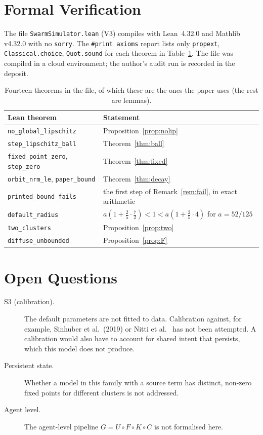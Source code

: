 \documentclass[11pt]{article}
\theoremstyle{definition}
\theoremstyle{remark}
\begin{document}
\section{Formal Verification}
The file \texttt{SwarmSimulator.lean} (V3) compiles with Lean~4.32.0 and Mathlib v4.32.0 with no \texttt{sorry}.
The \texttt{\#print axioms} report lists only \texttt{propext}, \texttt{Classical.choice}, \texttt{Quot.sound}
for each theorem in Table~\ref{tab:lean}. The file was compiled in a cloud environment; the author's audit run is
recorded in the deposit.
\begin{table}[ht]\centering\small
\begin{tabular}{@{}ll@{}}\toprule
Lean theorem & Statement\\\midrule
\texttt{no\_global\_lipschitz} & Proposition~\ref{prop:nolip}\\
\texttt{step\_lipschitz\_ball} & Theorem~\ref{thm:ball}\\
\texttt{fixed\_point\_zero}, \texttt{step\_zero} & Theorem~\ref{thm:fixed}\\
\texttt{orbit\_nrm\_le}, \texttt{paper\_bound} & Theorem~\ref{thm:decay}\\
\texttt{printed\_bound\_fails} & the first step of Remark~\ref{rem:fail}, in exact arithmetic\\
\texttt{default\_radius} & $a(1+\tfrac25\cdot\tfrac72)<1<a(1+\tfrac25\cdot4)$ for $a=52/125$\\
\texttt{two\_clusters} & Proposition~\ref{prop:two}\\
\texttt{diffuse\_unbounded} & Proposition~\ref{prop:F}\\\bottomrule
\end{tabular}
\caption{Fourteen theorems in the file, of which these are the ones the paper uses (the rest are lemmas).}\label{tab:lean}
\end{table}

\section{Open Questions}
\begin{description}
\item[S3 (calibration).] The default parameters are not fitted to data. Calibration against, for example,
Sinhuber et al.\ (2019) or Nitti et al.~\cite{nitti} has not been attempted. A calibration would also have to
account for shared intent that persists, which this model does not produce.
\item[Persistent state.] Whether a model in this family with a source term has distinct, non-zero fixed
points for different clusters is not addressed.
\item[Agent level.] The agent-level pipeline $G=U\circ F\circ K\circ C$ is not formalised here.
\end{description}
\end{document}
